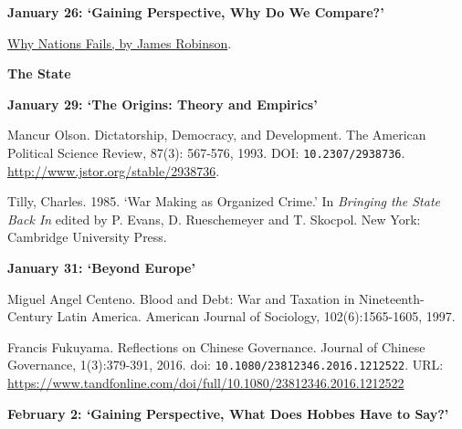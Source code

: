 \documentclass[letterpaper]{article}
\renewenvironment{itemize}{
  \begin{list}{}{
    \setlength{\leftmargin}{1.5em}
  }
}{
  \end{list}
}
\begin{document}
\begin{enumerate}
\begin{itemize}
		\item {\bf January 26: `Gaining Perspective, Why Do We Compare?'}
			\begin{itemize}	
				\item[$\bullet$] \href{https://www.youtube.com/watch?v=jsZDlBU36n0}{Why Nations Fails, by James Robinson}.
			\end{itemize}

	\end{itemize}


\item {\bf The State}
	\begin{itemize}
		
	\item {\bf January 29: `The Origins: Theory and Empirics'}
		\begin{itemize} 
			\item[$\bullet$] Mancur Olson. Dictatorship, Democracy, and Development. The American Political Science Review, 87(3): 567-576, 1993. DOI: \texttt{10.2307/2938736}. \url{http://www.jstor.org/stable/2938736}.
			\item[$\bullet$] Tilly, Charles. 1985. `War Making as Organized Crime.' In \emph{Bringing the State Back In} edited by P. Evans, D. Rueschemeyer and T. Skocpol. New York: Cambridge University Press.
		\end{itemize}
		

	\item {\bf January 31: `Beyond Europe'}
		\begin{itemize} 
			\item[$\bullet$] Miguel Angel Centeno. Blood and Debt: War and Taxation in Nineteenth-Century Latin America. American Journal of Sociology, 102(6):1565-1605, 1997.
			\item[$\bullet$] Francis Fukuyama. Reflections on Chinese Governance. Journal of Chinese Governance, 1(3):379-391, 2016. doi: \texttt{10.1080/23812346.2016.1212522}. URL: \url{https://www.tandfonline.com/doi/full/10.1080/23812346.2016.1212522}
		\end{itemize}

	\item {\bf  February 2: `Gaining Perspective, What Does Hobbes Have to Say?'} %


\end{itemize}
\end{enumerate}
\end{document}
